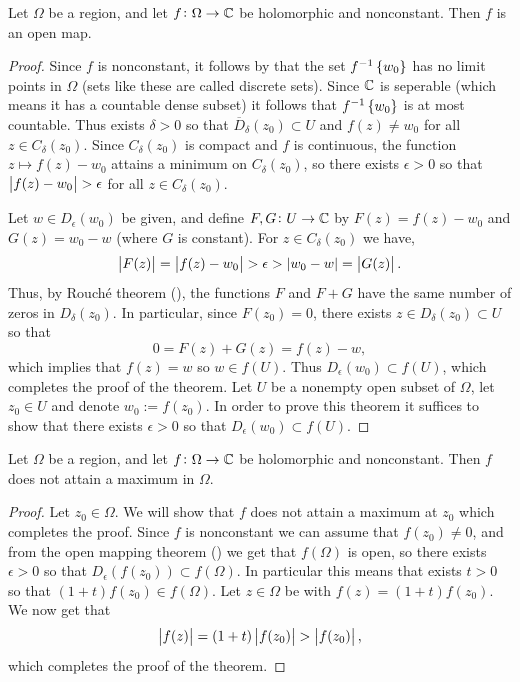\documentclass[11pt,a4paper]{article}
\begin{document}
\begin{theorem}
  \label{thm:open-mapping}
  Let $\Omega$ be a region,
  and let $f \colon \Omega \to \mathbb{C}$ be holomorphic and nonconstant.
  Then $f$ is an open map.
\end{theorem}
\begin{proof}
  Since $f$ is nonconstant, it follows by
   that the set $f^{-1}\left\{w_0\right\}$
  has no limit points in $\Omega$ (sets like these are called discrete sets).
  Since $\mathbb{C}$ is seperable (which means it has a countable dense subset)
  it follows that $f^{-1}\left\{w_0\right\}$ is at most countable.
  Thus exists $\delta > 0$ so that $\overline D_{\delta}(z_0) \subset U$ and
  $f(z) \neq w_0$ for all $z \in C_{\delta}(z_0)$.
  Since $C_{\delta}(z_0)$ is compact and $f$ is continuous,
  the function $z \mapsto f(z) - w_0$ attains a minimum on $C_{\delta}(z_0)$,
  so there exists $\epsilon > 0$ so that $\left\lvert f(z) - w_0\right\rvert > \epsilon$ for all
  $z \in C_{\delta}(z_0)$.

  Let $w \in D_{\epsilon}(w_0)$ be given,
  and define $F,G \colon U \to \mathbb{C}$ by $F(z) = f(z) - w_0$ and
  $G(z) = w_0 - w$ (where $G$ is constant).
  For $z \in C_{\delta}(z_0)$ we have,
  \[
    \left\lvert F(z)\right\rvert =
    \left\lvert f(z) - w_0\right\rvert >
    \epsilon >
    \left\lvert w_0 - w\right\rvert =
    \left\lvert G(z)\right\rvert.
  \]
  Thus, by Rouch\'e theorem (), the functions
  $F$ and $F + G$ have the same number of zeros in $D_{\delta}(z_0)$.
  In particular, since $F(z_0) = 0$,
  there exists $z \in D_{\delta}(z_0) \subset U$ so that
  \[
    0 = F(z) + G(z) = f(z) - w,
  \]
  which implies that $f(z) = w$ so $w \in f(U)$.
  Thus $D_{\epsilon}(w_0) \subset f(U)$,
  which completes the proof of the theorem.
  Let $U$ be a nonempty open subset of $\Omega$,
  let $z_0 \in U$ and denote $w_0 := f(z_0)$.
  In order to prove this theorem it suffices to show that there exists
  $\epsilon > 0$ so that $D_{\epsilon}(w_0) \subset f(U)$.
\end{proof}

\begin{theorem}
  Let $\Omega$ be a region,
  and let $f \colon \Omega \to \mathbb{C}$ be holomorphic and nonconstant.
  Then $f$ does not attain a maximum in $\Omega$.
\end{theorem}
\begin{proof}
  Let $z_0 \in \Omega$.
  We will show that $f$ does not attain a maximum at $z_0$ which completes
  the proof.
  Since $f$ is nonconstant we can assume that $f(z_0) \neq 0$,
  and from the open mapping theorem ()
  we get that $f(\Omega)$ is open,
  so there exists $\epsilon > 0$ so that
  $D_{\epsilon}(f(z_0)) \subset f(\Omega)$.
  In particular this means that exists $t > 0$ so that
  $(1 + t) f(z_0) \in f(\Omega)$.
  Let $z \in \Omega$ be with $f(z) = (1 + t) f(z_0)$.
  We now get that
  \[
    \left\lvert f(z)\right\rvert = (1 + t) \left\lvert f(z_0)\right\rvert > \left\lvert f(z_0)\right\rvert,
  \]
  which completes the proof of the theorem.
\end{proof}
\end{document}
